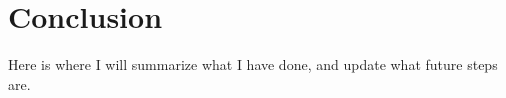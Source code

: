 \chapter{Conclusion}

\par Here is where I will summarize what I have done, and update what future steps are.